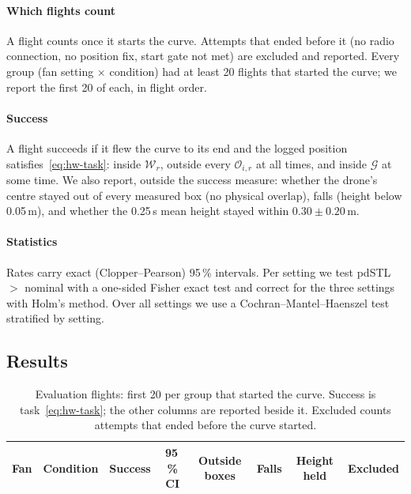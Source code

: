 \paragraph{Which flights count}
A flight counts once it starts the curve. Attempts that ended before it
(no radio connection, no position fix, start gate not met) are excluded
and reported. Every group (fan setting $\times$ condition) had at least 20
flights that started the curve; we report the first 20 of each, in flight
order.

\paragraph{Success}
A flight succeeds if it flew the curve to its end and the logged position
satisfies~\eqref{eq:hw-task}: inside $\mathcal{W}_r$, outside every
$\mathcal{O}_{i,r}$ at all times, and inside $\mathcal{G}$ at some time.
We also report, outside the success measure: whether the drone's centre
stayed out of every measured box (no physical overlap), falls (height
below 0.05\,m), and whether the 0.25\,s mean height stayed within
$0.30 \pm 0.20$\,m.

\paragraph{Statistics}
Rates carry exact (Clopper--Pearson) 95\,\% intervals. Per setting we test
pdSTL $>$ nominal with a one-sided Fisher exact test and correct for the
three settings with Holm's method. Over all settings we use a
Cochran--Mantel--Haenszel test stratified by setting.

\subsection{Results}

\begin{table}[t]
  \centering
  \caption{Evaluation flights: first 20 per group that started the curve.
  Success is task~\eqref{eq:hw-task}; the other columns are reported beside
  it. Excluded counts attempts that ended before the curve started.}
  \label{tab:hw-results}
  \begin{tabular}{llcccccc}
    \toprule
    Fan & Condition & Success & 95\,\% CI & Outside boxes & Falls & Height held & Excluded \\
    \midrule
    
    \bottomrule
  \end{tabular}
\end{table}

